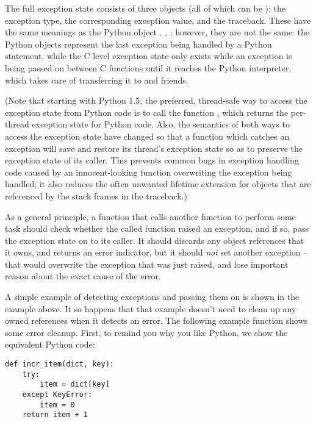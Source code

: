 The full exception state consists of three objects (all of which can 
be \NULL{} ): the exception type, the corresponding exception 
value, and the traceback.  These have the same meanings as the Python 
object , , 
; however, they are not the same: the Python 
objects represent the last exception being handled by a Python 
 statement, while the C level exception state only 
exists while an exception is being passed on between C functions until 
it reaches the Python interpreter, which takes care of transferring it 
to  and friends.

(Note that starting with Python 1.5, the preferred, thread-safe way to 
access the exception state from Python code is to call the function 
, which returns the per-thread exception state 
for Python code.  Also, the semantics of both ways to access the 
exception state have changed so that a function which catches an 
exception will save and restore its thread's exception state so as to 
preserve the exception state of its caller.  This prevents common bugs 
in exception handling code caused by an innocent-looking function 
overwriting the exception being handled; it also reduces the often 
unwanted lifetime extension for objects that are referenced by the 
stack frames in the traceback.)

As a general principle, a function that calls another function to 
perform some task should check whether the called function raised an 
exception, and if so, pass the exception state on to its caller.  It 
should discards any object references that it owns, and returns an 
error indicator, but it should \emph{not} set another exception -- 
that would overwrite the exception that was just raised, and lose 
important reason about the exact cause of the error.

A simple example of detecting exceptions and passing them on is shown 
in the  example above.  It so happens that that 
example doesn't need to clean up any owned references when it detects 
an error.  The following example function shows some error cleanup.  
First, to remind you why you like Python, we show the equivalent
Python code:

\begin{verbatim}
def incr_item(dict, key):
    try:
        item = dict[key]
    except KeyError:
        item = 0
    return item + 1
\end{verbatim}

